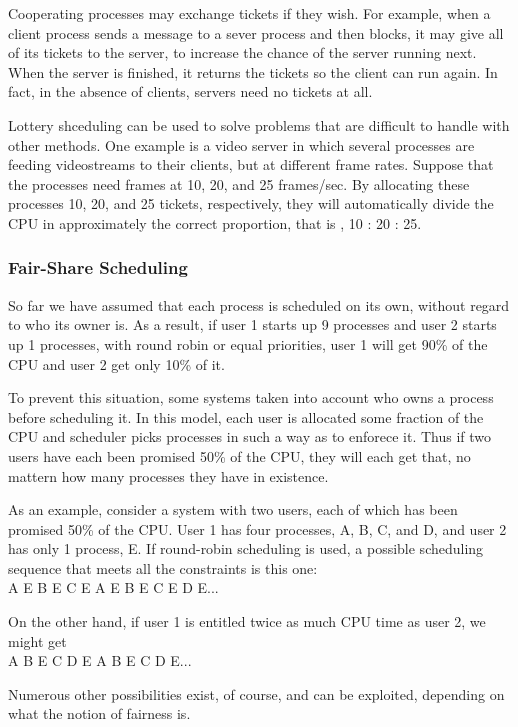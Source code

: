 \documentclass{book}
\begin{document}
Cooperating processes may exchange tickets if they wish.
For example, when a client process sends a message to a sever process and then blocks, it may give all of its tickets to the server,
to increase the chance of the server running next.
When the server is finished, it returns the tickets so the client can run again.
In fact, in the absence of clients, servers need no tickets at all.

Lottery shceduling can be used to solve problems that are difficult to handle with other methods.
One example is a video server in which several processes are feeding videostreams to their clients, but at different frame rates.
Suppose that the processes need frames at 10, 20, and 25 frames/sec.
By allocating these processes 10, 20, and 25 tickets, respectively,
they will automatically divide the CPU in approximately the correct proportion, that is , 10 : 20 : 25.

\subsubsection*{Fair-Share Scheduling}
So far we have assumed that each process is scheduled on its own, without regard to who its owner is.
As a result, if user 1 starts up 9 processes and user 2 starts up 1 processes,
with round robin or equal priorities, user 1 will get 90\% of the CPU and user 2 get only 10\% of it.

To prevent this situation, some systems taken into account who owns a process before scheduling it.
In this model, each user is allocated some fraction of the CPU and scheduler picks processes in such a way as to enforece it.
Thus if two users have each been promised 50\% of the CPU, they will each get that, 
no mattern how many processes they have in existence.

As an example, consider a system with two users, each of which has been promised 50\% of the CPU.
User 1 has four processes, A, B, C, and D, and user 2 has only 1 process, E.
If round-robin scheduling is used, a possible scheduling sequence that meets all the constraints is this one:\\
A E B E C E A E B E C E D E...

On the other hand, if user 1 is entitled twice as much CPU time as user 2, we might get\\
A B E C D E A B E C D E...

Numerous other possibilities exist, of course, and can be exploited, depending on what the notion of fairness is.
\end{document}
